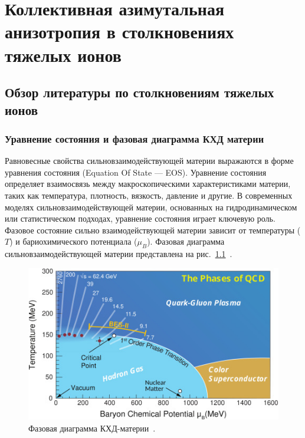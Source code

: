 \chapter{Коллективная азимутальная анизотропия в столкновениях тяжелых ионов} \label{chapt1}

\section{Обзор литературы по столкновениям тяжелых ионов}

\subsection{Уравнение состояния и фазовая диаграмма КХД материи}

Равновесные свойства сильновзаимодействующей материи выражаются в форме уравнения состояния (Equation Of State — EOS). 
Уравнение состояния определяет взаимосвязь между макроскопическими характеристиками материи, таких как температура, плотность, вязкость, давление и другие.
В современных моделях сильновзаимодействующей материи, основанных на гидродинамическом или статистическом подходах, уравнение состояния играет ключевую роль.
Фазовое состояние сильно взаимодействующей материи зависит от температуры ($T$) и бариохимического потенциала ($\mu_B$).
Фазовая диаграмма сильновзаимодействующей материи представлена на рис.~\ref{fig:qcd_phase_diagram}~\cite{Bzdak:2019pkr}.
%
\begin{figure}[h]
    \centering
    \includegraphics[width=0.5\linewidth]{images/1-s2.0-S0370157320300156-gr1.jpg}
    \caption{Фазовая диаграмма КХД-материи~\cite{Bzdak:2019pkr}.}
    \label{fig:qcd_phase_diagram}
\end{figure}

